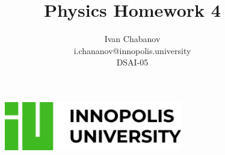 \begin{titlepage}

    \title{Physics Homework 4}
    \author{Ivan Chabanov\\i.chananov@innopolis.university\\DSAI-05}

    \begin{figure}[t]
        \centering
        \includegraphics[width=0.69\textwidth]{innou-logo.png} %
    \end{figure}

    \maketitle

\end{titlepage}
